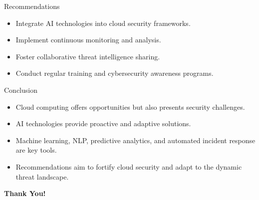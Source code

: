 \documentclass{beamer}
\begin{document}
\begin{frame}{Recommendations}
\begin{itemize}
    \item Integrate AI technologies into cloud security frameworks.
    \item Implement continuous monitoring and analysis.
    \item Foster collaborative threat intelligence sharing.
    \item Conduct regular training and cybersecurity awareness programs.
\end{itemize}
\end{frame}

\begin{frame}{Conclusion}
\begin{itemize}
    \item Cloud computing offers opportunities but also presents security challenges.
    \item AI technologies provide proactive and adaptive solutions.
    \item Machine learning, NLP, predictive analytics, and automated incident response are key tools.
    \item Recommendations aim to fortify cloud security and adapt to the dynamic threat landscape.
\end{itemize}
    \begin{center}
    \Huge \textbf{Thank You!} \\[20pt]
        
    \end{center}
   

\end{frame}
\end{document}
